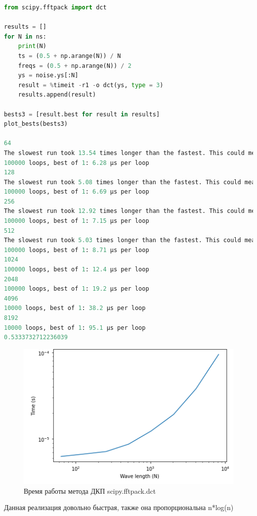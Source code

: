 \begin{lstlisting}[language=Python]
from scipy.fftpack import dct

results = []
for N in ns:
    print(N)
    ts = (0.5 + np.arange(N)) / N
    freqs = (0.5 + np.arange(N)) / 2
    ys = noise.ys[:N]
    result = %timeit -r1 -o dct(ys, type = 3)
    results.append(result)

bests3 = [result.best for result in results]
plot_bests(bests3)

64
The slowest run took 13.54 times longer than the fastest. This could mean that an intermediate result is being cached.
100000 loops, best of 1: 6.28 µs per loop
128
The slowest run took 5.08 times longer than the fastest. This could mean that an intermediate result is being cached.
100000 loops, best of 1: 6.69 µs per loop
256
The slowest run took 12.92 times longer than the fastest. This could mean that an intermediate result is being cached.
100000 loops, best of 1: 7.15 µs per loop
512
The slowest run took 5.03 times longer than the fastest. This could mean that an intermediate result is being cached.
100000 loops, best of 1: 8.71 µs per loop
1024
100000 loops, best of 1: 12.4 µs per loop
2048
100000 loops, best of 1: 19.2 µs per loop
4096
10000 loops, best of 1: 38.2 µs per loop
8192
10000 loops, best of 1: 95.1 µs per loop
0.5333732712236039
\end{lstlisting}

\begin{figure}[H]
	\begin{center}
		\includegraphics[scale=1]{fig/lab06/lab06_03.png}
		\caption{Время работы метода ДКП scipy.fftpack.dct}
	\end{center}
\end{figure}

Данная реализация довольно быстрая, также она пропорциональна n*log(n)

